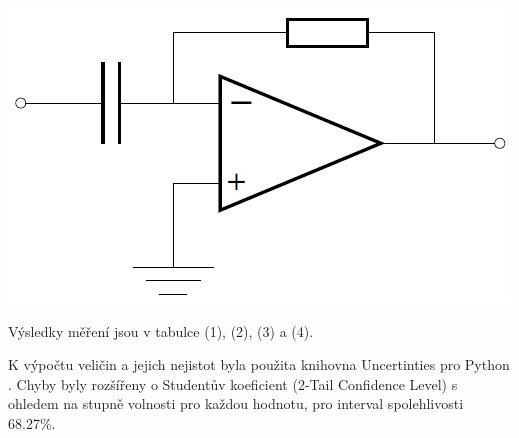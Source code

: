 \documentclass[a4paper,11pt]{article}
\begin{document}
\begin{minipage}[t]{0.5\textwidth}
                \vspace{10pt}           
                \par \centering
                \includegraphics[scale=0.45]{derivator}
                \captionsetup{justification=centering, font=footnotesize}
                \label{fig:derivator}
                \vspace{10pt}
                \raggedright

                \par Výsledky měření jsou v tabulce (1), (2), (3) a (4).
                \vspace{10pt}
                \par K výpočtu veličin a jejich nejistot byla použita knihovna Uncertinties pro Python \cite{uncertainties}. Chyby byly rozšířeny o Studentův koeficient (2-Tail Confidence Level) s ohledem na stupně volnosti pro každou hodnotu, pro interval spolehlivosti 68.27\%.
    \end{minipage}
\newpage
\end{document}

